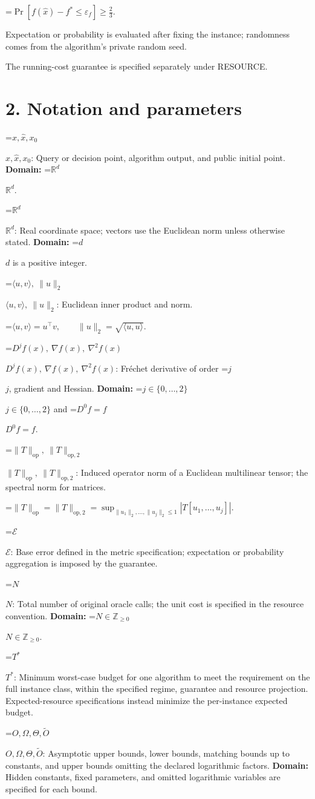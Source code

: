 \documentclass[10pt,a4paper]{article}
\newcommand{\AtlasMath}[1]{\par\begingroup\centering\setbox0=\hbox{$\displaystyle #1$}\ifdim\wd0>1.4\linewidth\typeout{ATLAS WIDE FORMULA: \the\wd0}\fi\ifdim\wd0>\linewidth\resizebox{\linewidth}{!}{\box0}\else\box0\fi\par\endgroup}
\newcommand{\AtlasInlineMath}[1]{\begingroup\setbox0=\hbox{$#1$}\ifdim\wd0>.4\linewidth\endgroup\AtlasMath{#1}\else\endgroup$#1$\fi}
\begin{document}
\AtlasMath{\Pr\!\left[f(\widehat{x})-f^*\le \varepsilon_f\right]\ge\frac23.}


Expectation or probability is evaluated after fixing the instance; randomness comes from the algorithm's private random seed.

The running-cost guarantee is specified separately under RESOURCE.

\section{2. Notation and parameters}
\AtlasInlineMath{x,\widehat{x},x_0}: Query or decision point, algorithm output, and public initial point. \textbf{Domain:} \AtlasInlineMath{\mathbb{R}^d}.

\AtlasInlineMath{\mathbb{R}^d}: Real coordinate space; vectors use the Euclidean norm unless otherwise stated. \textbf{Domain:} \AtlasInlineMath{d} is a positive integer.

\AtlasInlineMath{\langle u,v\rangle,\ \|u\|_2}: Euclidean inner product and norm.


\AtlasMath{\langle u,v\rangle=u^\top v,\qquad\|u\|_2=\sqrt{\langle u,u\rangle}.}


\AtlasInlineMath{D^jf(x),\ \nabla f(x),\ \nabla^2f(x)}: Fréchet derivative of order \AtlasInlineMath{j}, gradient and Hessian. \textbf{Domain:} \AtlasInlineMath{j\in\{0,\ldots,2\}} and \AtlasInlineMath{D^0f=f}.

\AtlasInlineMath{\|T\|_{\mathrm{op}},\ \|T\|_{\mathrm{op},2}}: Induced operator norm of a Euclidean multilinear tensor; the spectral norm for matrices.


\AtlasMath{\|T\|_{\mathrm{op}}=\|T\|_{\mathrm{op},2}=\sup_{\|u_1\|_2,\ldots,\|u_j\|_2\le1}|T[u_1,\ldots,u_j]|.}


\AtlasInlineMath{\mathcal{E}}: Base error defined in the metric specification; expectation or probability aggregation is imposed by the guarantee.

\AtlasInlineMath{N}: Total number of original oracle calls; the unit cost is specified in the resource convention. \textbf{Domain:} \AtlasInlineMath{N\in\mathbb{Z}_{\ge0}}.

\AtlasInlineMath{T^*}: Minimum worst-case budget for one algorithm to meet the requirement on the full instance class, within the specified regime, guarantee and resource projection. Expected-resource specifications instead minimize the per-instance expected budget.

\AtlasInlineMath{O,\Omega,\Theta,\widetilde{O}}: Asymptotic upper bounds, lower bounds, matching bounds up to constants, and upper bounds omitting the declared logarithmic factors. \textbf{Domain:} Hidden constants, fixed parameters, and omitted logarithmic variables are specified for each bound.
\end{document}
